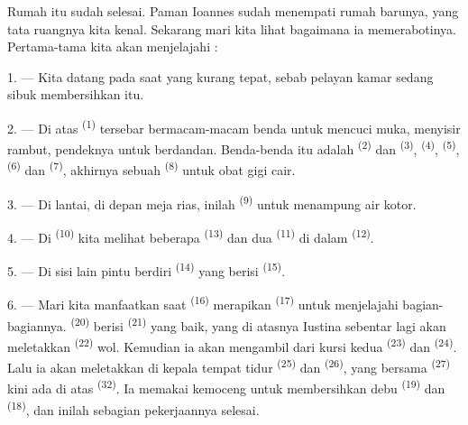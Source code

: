 \VUsaut{6.0mm}
\VUsaut{1.4mm}
\VUsaut{0.4mm}
\VUsaut{2.2mm}

Rumah itu sudah selesai. Paman Ioannes sudah menempati rumah barunya,
yang tata ruangnya kita kenal. Sekarang mari kita lihat bagaimana ia
memerabotinya. Pertama-tama kita akan menjelajahi :

\VUsaut{3.0mm}

1. --- Kita datang pada saat yang kurang tepat, sebab pelayan kamar
sedang sibuk membersihkan  itu.

2. --- Di atas  \textsuperscript{(1)} tersebar
bermacam-macam benda untuk mencuci muka, menyisir rambut, pendeknya
untuk berdandan. Benda-benda itu adalah 
\textsuperscript{(2)} dan  \textsuperscript{(3)},
 \textsuperscript{(4)}, 
\textsuperscript{(5)},  \textsuperscript{(6)} dan
 \textsuperscript{(7)}, akhirnya sebuah  \textsuperscript{(8)} untuk obat gigi cair.

3. --- Di lantai, di depan meja rias, inilah 
\textsuperscript{(9)} untuk menampung air kotor.

4. --- Di  \textsuperscript{(10)} kita melihat
beberapa  \textsuperscript{(13)} dan dua
 \textsuperscript{(11)} di dalam 
\textsuperscript{(12)}.

5. --- Di sisi lain pintu berdiri 
\textsuperscript{(14)} yang berisi 
\textsuperscript{(15)}.

6. --- Mari kita manfaatkan saat 
\textsuperscript{(16)} merapikan 
\textsuperscript{(17)} untuk menjelajahi bagian-bagiannya.
 \textsuperscript{(20)} berisi
 \textsuperscript{(21)} yang baik, yang di atasnya
Iustina sebentar lagi akan meletakkan 
\textsuperscript{(22)} wol. Kemudian ia akan mengambil dari kursi kedua
 \textsuperscript{(23)} dan 
\textsuperscript{(24)}. Lalu ia akan meletakkan di kepala tempat tidur
 \textsuperscript{(25)} dan 
\textsuperscript{(26)}, yang bersama 
\textsuperscript{(27)} kini ada di atas 
\textsuperscript{(32)}. Ia memakai kemoceng untuk membersihkan debu
 \textsuperscript{(19)} dan 
\textsuperscript{(18)}, dan inilah sebagian pekerjaannya selesai.

